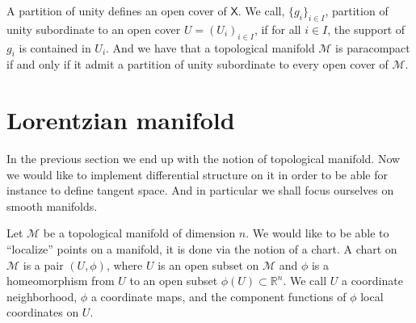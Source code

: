 \documentclass[10pt]{book}
\newcommand{\Mcal}{\mathcal{M}}
\newcommand{\Rbb}{\mathbb{R}}
\newcommand{\Xsf}{\mathsf{X}}
\theoremstyle{break}
\begin{document}
A partition of unity defines an open cover of $\Xsf$. We call, $\{g_i\}_{i \in I}$, partition of unity subordinate to an open cover $U=(U_i)_{i \in I}$, if for all $i \in I$, the support of $g_i$ is contained in $U_i$. And we have that a topological manifold $\Mcal$ is paracompact if and only if it admit a partition of unity subordinate to every open cover of $\Mcal$.


\section{Lorentzian manifold}


In the previous section we end up with the notion of topological manifold. Now we would like to implement differential structure on it in order to be able for instance to define tangent space. And in particular we shall focus ourselves on smooth manifolds.

\bigskip

Let $\Mcal$ be a topological manifold of dimension $n$. We would like to be able to ``localize'' points on a manifold, it is done via the notion of a chart. A chart on $\Mcal$ is a pair $(U,\phi)$, where $U$ is an open subset on $\Mcal$ and $\phi$ is a homeomorphism from $U$ to an open subset $\phi(U) \subset \Rbb^n$. We call $U$ a coordinate neighborhood, $\phi$ a coordinate maps, and the component functions of $\phi$ local coordinates on $U$.
\end{document}
